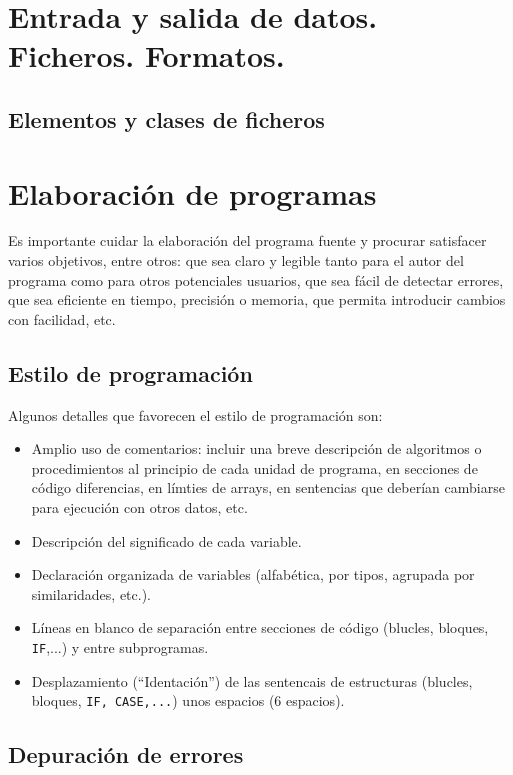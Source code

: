 \section{Entrada y salida de datos. Ficheros. Formatos.}

\subsection{Elementos y clases de ficheros}


\section{Elaboración de programas}

Es importante cuidar la elaboración del programa fuente y procurar satisfacer varios objetivos, entre otros: que sea claro y legible tanto para el autor del programa como para otros potenciales usuarios, que sea fácil de detectar errores, que sea eficiente en tiempo, precisión o memoria, que permita introducir cambios con facilidad, etc.

\subsection{Estilo de programación}

Algunos detalles que favorecen el estilo de programación son:

\begin{itemize}
	\item Amplio uso de comentarios: incluir una breve descripción de algoritmos o procedimientos al principio de cada unidad de programa, en secciones de código diferencias, en límties de arrays, en sentencias que deberían cambiarse para ejecución con otros datos, etc.
	\item Descripción del significado de cada variable.
	\item Declaración organizada de variables (alfabética, por tipos, agrupada por similaridades, etc.).
	\item Líneas en blanco de separación entre secciones de código (blucles, bloques, {\tt IF},...) y entre subprogramas.
	\item Desplazamiento (``Identación'') de las sentencais de estructuras (blucles, bloques, {\tt IF, CASE,...}) unos espacios (6 espacios).

\end{itemize}
\subsection{Depuración de errores}

